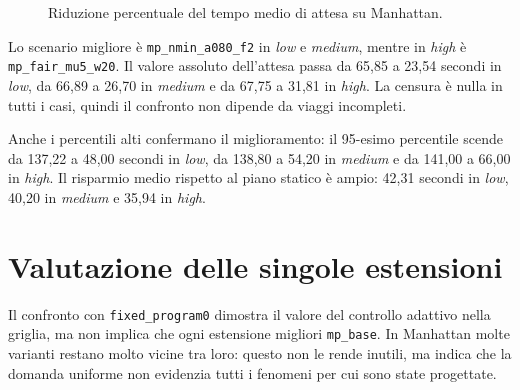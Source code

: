\documentclass[12pt,a4paper,oneside]{report}
\numberwithin{equation}{chapter}
\begin{document}
\begin{figure}[htbp]
    \centering
    \caption{Riduzione percentuale del tempo medio di attesa su Manhattan.}
    \label{fig:manhattan-reduction}
\end{figure}

Lo scenario migliore è \texttt{mp\_nmin\_a080\_f2} in \emph{low} e \emph{medium}, mentre in
\emph{high} è \texttt{mp\_fair\_mu5\_w20}. Il valore assoluto dell'attesa passa da
65,85 a 23,54 secondi in \emph{low}, da 66,89 a 26,70 in \emph{medium} e da 67,75 a 31,81 in
\emph{high}. La censura è nulla in tutti i casi, quindi il confronto non dipende da
viaggi incompleti.

Anche i percentili alti confermano il miglioramento: il 95-esimo percentile
scende da 137,22 a 48,00 secondi in \emph{low}, da 138,80 a 54,20 in \emph{medium} e da
141,00 a 66,00 in \emph{high}. Il risparmio medio rispetto al piano statico è ampio:
42,31 secondi in \emph{low}, 40,20 in \emph{medium} e 35,94 in \emph{high}.

\section{Valutazione delle singole estensioni}

Il confronto con \texttt{fixed\_program0} dimostra il valore del controllo
adattivo nella griglia, ma non implica che ogni estensione migliori
\texttt{mp\_base}. In Manhattan molte varianti restano molto vicine tra loro:
questo non le rende inutili, ma indica che la domanda uniforme non evidenzia
tutti i fenomeni per cui sono state progettate.
\end{document}
